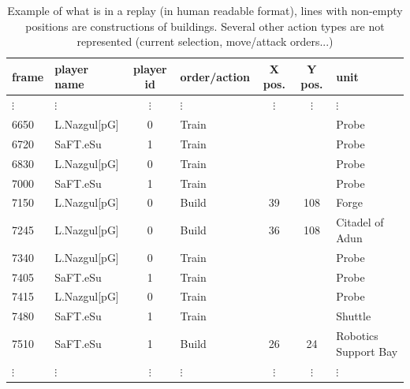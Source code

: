 \begin{table}[!h]
\begin{center}
\begin{tabular}{|llclccl|}
\hline
frame & player name & player id & order/action & X pos. & Y pos. & unit \\
\hline
$\vdots$ & $\vdots$ & $\vdots$ & $\vdots$ & $\vdots$ & $\vdots$ & $\vdots$ \\
6650 & L.Nazgul[pG] & 0 & Train & & & Probe\\
6720 & SaFT.eSu & 1 & Train & & & Probe\\
6830 & L.Nazgul[pG] & 0 & Train & & & Probe\\
7000 & SaFT.eSu & 1 & Train & & & Probe\\
7150 & L.Nazgul[pG] & 0 & Build & 39 & 108 & Forge\\
7245 & L.Nazgul[pG] & 0 & Build & 36 & 108 & Citadel of Adun\\
7340 & L.Nazgul[pG] & 0 & Train & & & Probe\\
7405 & SaFT.eSu & 1 & Train & & & Probe\\
7415 & L.Nazgul[pG] & 0 & Train & & & Probe\\
7480 & SaFT.eSu & 1 & Train & & & Shuttle\\
7510 & SaFT.eSu & 1 & Build & 26 & 24 & Robotics Support Bay\\
$\vdots$ & $\vdots$ & $\vdots$ & $\vdots$ & $\vdots$ & $\vdots$ & $\vdots$ \\
\hline
\end{tabular}
\caption{Example of what is in a replay (in human readable format), lines with non-empty positions are constructions of buildings. Several other action types are not represented (current selection, move/attack orders...)}
\label{tab:replay_example}
\end{center}
\end{table}

